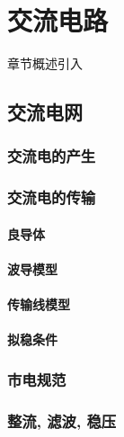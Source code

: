 \chapter{交流电路}\label{21}

章节概述引入

\section{交流电网}\label{21-1}

\subsection{交流电的产生}\label{21-1-1}

\subsection{交流电的传输}\label{21-1-2}

\subsubsection{良导体}\label{21-1-2-1}

\subsubsection{波导模型}\label{21-1-2-2}

\subsubsection{传输线模型}\label{21-1-2-3}

\subsubsection{拟稳条件}\label{21-1-2-4}

\subsection{市电规范}\label{21-1-3}

\subsection{整流, 滤波, 稳压}\label{21-1-4}
